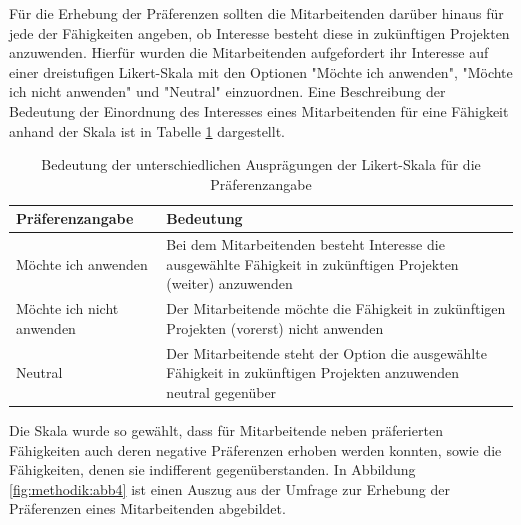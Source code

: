 Für die Erhebung der Präferenzen sollten die Mitarbeitenden darüber hinaus für jede der Fähigkeiten angeben, ob Interesse besteht diese in zukünftigen Projekten anzuwenden.
Hierfür wurden die Mitarbeitenden aufgefordert ihr Interesse auf einer dreistufigen Likert-Skala mit den Optionen "Möchte ich anwenden", "Möchte ich nicht anwenden" und "Neutral" einzuordnen.
Eine Beschreibung der Bedeutung der Einordnung des Interesses eines Mitarbeitenden für eine Fähigkeit anhand der Skala ist in Tabelle \ref{tab:methodik:tab2} dargestellt.

\begin{table}[htbp]
    \begin{center}
    \begin{tabular}{p{1.5in}|p{3.25in}}
    {\textbf{Präferenzangabe}} & {\textbf{Bedeutung}}\\
    \hline
	Möchte ich anwenden & Bei dem Mitarbeitenden besteht Interesse die ausgewählte Fähigkeit in zukünftigen Projekten (weiter) anzuwenden \\
    \hline
    Möchte ich nicht anwenden & Der Mitarbeitende möchte die Fähigkeit in zukünftigen Projekten (vorerst) nicht anwenden \\
    \hline
    Neutral & Der Mitarbeitende steht der Option die ausgewählte Fähigkeit in zukünftigen Projekten anzuwenden neutral gegenüber \\
    \end{tabular}
    \end{center}
    \caption[Bedeutung der unterschiedlichen Ausprägungen der Likert-Skala für die Präferenzangabe]{Bedeutung der unterschiedlichen Ausprägungen der Likert-Skala für die Präferenzangabe}
	\label{tab:methodik:tab2}
\end{table}

Die Skala wurde so gewählt, dass für Mitarbeitende neben präferierten Fähigkeiten auch deren negative Präferenzen erhoben werden konnten, sowie die Fähigkeiten, denen sie indifferent gegenüberstanden.
In Abbildung \ref{fig:methodik:abb4} ist einen Auszug aus der Umfrage zur Erhebung der Präferenzen eines Mitarbeitenden abgebildet.

